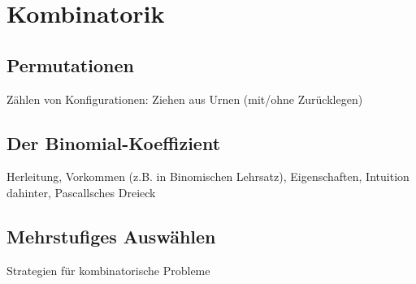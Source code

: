 \chapter{Kombinatorik}

\section{Permutationen}
Zählen von Konfigurationen: Ziehen aus Urnen (mit/ohne Zurücklegen)

\section{Der Binomial-Koeffizient}
Herleitung, Vorkommen (z.B. in Binomischen Lehrsatz), Eigenschaften, Intuition dahinter, Pascallsches Dreieck

\section{Mehrstufiges Auswählen}
Strategien für kombinatorische Probleme